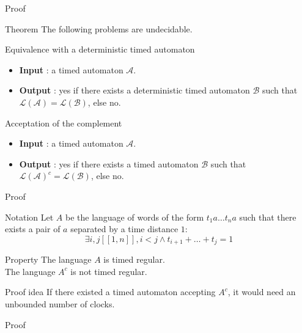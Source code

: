 \begin{frame}{Proof}

  \begin{block}{Theorem}
    The following problems are undecidable.
  \end{block}

  \begin{alertblock}{Equivalence with a deterministic timed automaton}
    \begin{itemize}
	\item \textbf{Input} : a timed automaton $\mathcal{A}$.
	\item \textbf{Output} : yes if there exists a deterministic timed automaton $\mathcal{B}$ such that $\mathcal{L}(\mathcal{A}) = \mathcal{L}(\mathcal{B})$, else no.
    \end{itemize}
  \end{alertblock}
  
    \begin{alertblock}{Acceptation of the complement}
    \begin{itemize}
	\item \textbf{Input} : a timed automaton $\mathcal{A}$.
	\item \textbf{Output} : yes if there exists a timed automaton $\mathcal{B}$ such that $\mathcal{L}(\mathcal{A})^c = \mathcal{L}(\mathcal{B})$, else no.
    \end{itemize}
  \end{alertblock}

\end{frame}

\begin{frame}{Proof}
   \begin{block}{Notation}
    Let $A$ be the language of words of the form $t_1 a \dots t_n a$ such that there exists a pair of $a$ separated by a time distance $1$:
$$\exists i,j [\![1,n]\!], i < j  \land  t_{i+1} + \dots + t_j = 1$$
  \end{block}
  \begin{block}{Property}
    The language $A$ is timed regular.\\
    The language $A^c$ is not timed regular.
  \end{block}
  \begin{block}{Proof idea}
    If there existed a timed automaton accepting $A^c$, it would need an unbounded number of clocks.
  \end{block}
\end{frame}{Proof}
